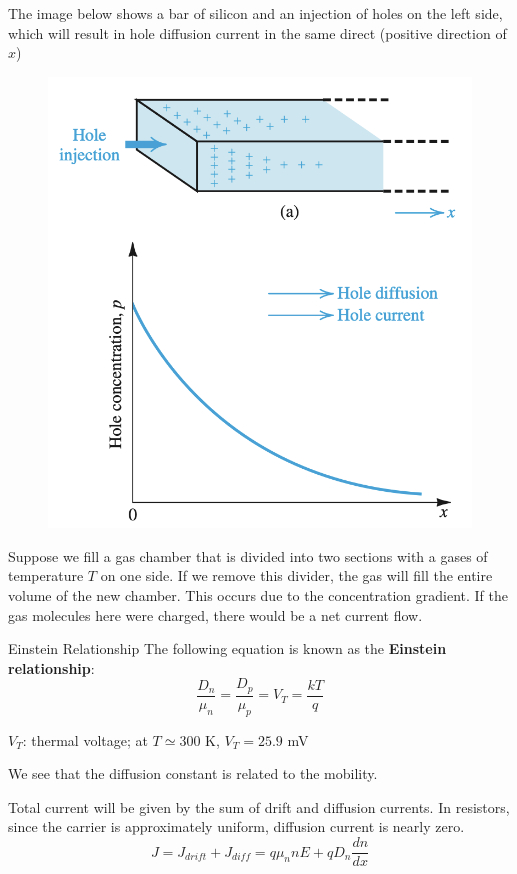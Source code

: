 The image below shows a bar of silicon and an injection of holes on the left side, which will result in hole diffusion current in the same direct (positive direction of $x$)

\begin{figure}[H]
    \centering
    \includegraphics[scale=0.5]{figs/ch02/diffusion_current.png}
\end{figure}

Suppose we fill a gas chamber that is divided into two sections with a gases of temperature $T$ on one side. If we remove this divider, the gas will fill the entire volume of the new chamber. This occurs due to the concentration gradient. If the gas molecules here were charged, there would be a net current flow.

\begin{Analysis}{Einstein Relationship}{}
    The following equation is known as the \textbf{Einstein relationship}:
        \[\frac{D_n}{\mu_n} = \frac{D_p}{\mu_p} = V_T = \frac{kT}{q}\]
    \begin{gline}
        \item $V_T$: thermal voltage; at $T \simeq 300$ K, $V_T = 25.9$ mV
    \end{gline}
    We see that the diffusion constant is related to the mobility.
\end{Analysis}
Total current will be given by the sum of drift and diffusion currents. In resistors, since the carrier is approximately uniform, diffusion current is nearly zero.
    \[J = J_{drift} + J_{diff} = q\mu_n n E + qD_n \frac{dn}{dx}\]

